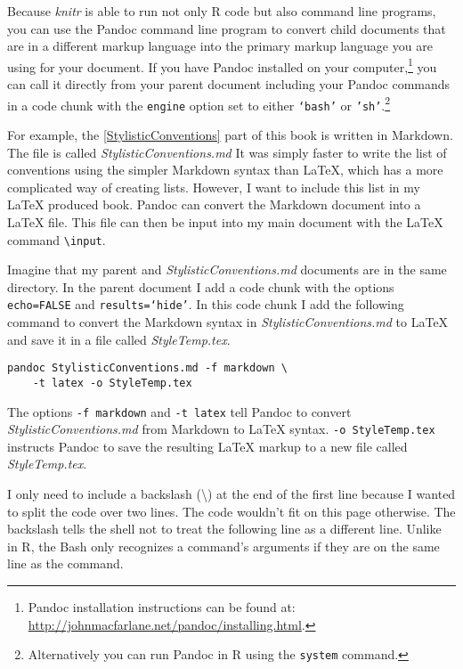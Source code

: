 Because {\emph{knitr}} is able to run not only R code but also command line programs, you can use the Pandoc  command line program to convert child documents that are in a different markup language into the primary markup language you are using for your document. If you have Pandoc installed on your computer,\footnote{Pandoc installation instructions can be found at: \url{http://johnmacfarlane.net/pandoc/installing.html}.} you can call it directly from your parent document including your Pandoc commands in a code chunk with the \texttt{engine} option set to either \texttt{`bash'} or \texttt{'sh'}.\footnote{Alternatively you can run Pandoc in R using the {\tt{system}} command.} 

For example, the \ref{StylisticConventions} part of this book is written in Markdown. The file is called {\emph{StylisticConventions.md}} It was simply faster to write the list of conventions using the simpler Markdown syntax than LaTeX, which has a more complicated way of creating lists. However, I want to include this list in my LaTeX produced book. Pandoc can convert the Markdown document into a LaTeX file. This file can then be input into my main document with the LaTeX command \texttt{\textbackslash{}input}.

Imagine that my parent and {\emph{StylisticConventions.md}} documents are in the same directory. In the parent document I add a code chunk with the options {\tt{echo=FALSE}} and {\tt{results=`hide'}}. In this code chunk I add the following command to convert the Markdown syntax in {\emph{StylisticConventions.md}} to LaTeX and save it in a file called {\emph{StyleTemp.tex}}.

\begin{knitrout}
\color{fgcolor}\begin{kframe}
\begin{verbatim}
pandoc StylisticConventions.md -f markdown \
    -t latex -o StyleTemp.tex
\end{verbatim}
\end{kframe}
\end{knitrout}


\noindent The options {\tt{-f markdown}} and {\tt{-t latex}} tell Pandoc to convert {\emph{StylisticConventions.md}} from Markdown to LaTeX syntax. {\tt{-o StyleTemp.tex}} instructs Pandoc to save the resulting LaTeX markup to a new file called {\emph{StyleTemp.tex}}. 

I only need to include a backslash (\textbackslash{}) at the end of the first line because I wanted to split the code over two lines. The code wouldn't fit on this page otherwise. The backslash tells the shell not to treat the following line as a different line. Unlike in R, the Bash only recognizes a command's arguments if they are on the same line as the command. 

